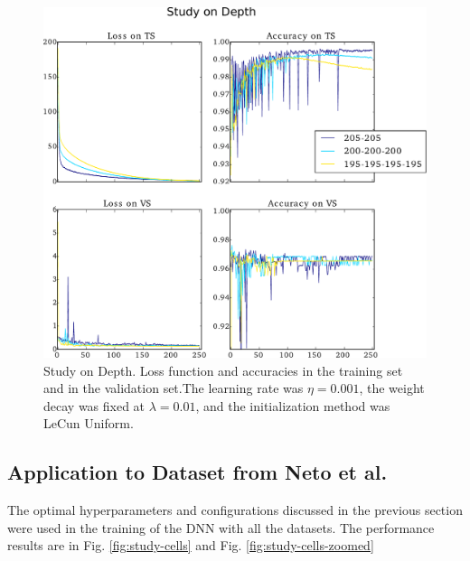 \documentclass{article}
\begin{document}
\begin{figure}[H]
	\centering
	\includegraphics[width=\linewidth]{study_on_depth_v2.pdf}
	\caption{Study on Depth. Loss function and accuracies in the training set and in the validation set.The learning rate was $\eta = 0.001$, the weight decay was fixed at $\lambda = 0.01$, and the initialization method was LeCun Uniform.
}
\label{fig:study-depth}
\end{figure}

\subsection{Application to Dataset from Neto et al.}
\label{subsec:application}
The optimal hyperparameters and configurations discussed in the previous section were used in the training of the DNN with all the datasets. The performance results are in Fig. \ref{fig:study-cells} and Fig. \ref{fig:study-cells-zoomed}
\end{document}
